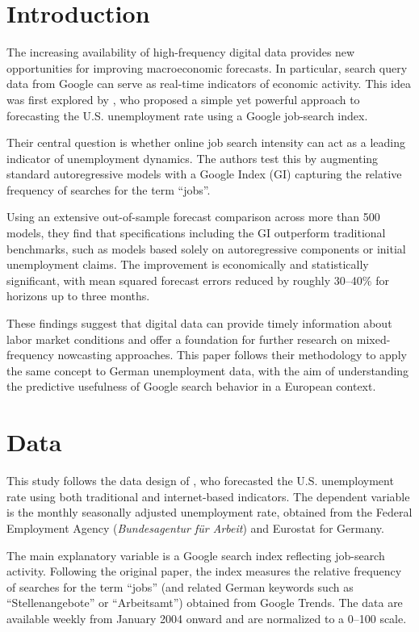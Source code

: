 \documentclass{article}
\begin{document}
\section{Introduction}

The increasing availability of high-frequency digital data provides new opportunities for improving macroeconomic forecasts. In particular, search query data from Google can serve as real-time indicators of economic activity. This idea was first explored by \citet{DamuriMarcucci2009}, who proposed a simple yet powerful approach to forecasting the U.S. unemployment rate using a Google job-search index.

Their central question is whether online job search intensity can act as a leading indicator of unemployment dynamics. The authors test this by augmenting standard autoregressive models with a Google Index (GI) capturing the relative frequency of searches for the term ``jobs''. 

Using an extensive out-of-sample forecast comparison across more than 500 models, they find that specifications including the GI outperform traditional benchmarks, such as models based solely on autoregressive components or initial unemployment claims. The improvement is economically and statistically significant, with mean squared forecast errors reduced by roughly 30–40\% for horizons up to three months. 

These findings suggest that digital data can provide timely information about labor market conditions and offer a foundation for further research on mixed-frequency nowcasting approaches. This paper follows their methodology to apply the same concept to German unemployment data, with the aim of understanding the predictive usefulness of Google search behavior in a European context.

\section{Data}

This study follows the data design of \citet{DamuriMarcucci2009}, who forecasted the U.S. unemployment rate using both traditional and internet-based indicators. The dependent variable is the monthly seasonally adjusted unemployment rate, obtained from the Federal Employment Agency (\emph{Bundesagentur für Arbeit}) and Eurostat for Germany.

The main explanatory variable is a Google search index reflecting job-search activity. Following the original paper, the index measures the relative frequency of searches for the term ``jobs'' (and related German keywords such as ``Stellenangebote'' or ``Arbeitsamt'') obtained from Google Trends. The data are available weekly from January 2004 onward and are normalized to a 0–100 scale.
\end{document}
